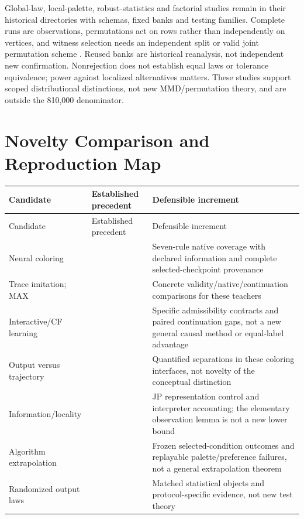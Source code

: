 \documentclass[10pt]{article}
\begin{document}
Global-law, local-palette, robust-statistics and factorial studies remain
in their historical directories with schemas, fixed banks and testing
families. Complete runs are observations, permutations act on rows rather
than independently on vertices, and witness selection needs an independent
split or valid joint permutation scheme
\citep{gretton2012kernel,hemerik2018exact,phipson2010permutation,holm1979simple}.
Reused banks are historical reanalysis, not independent new confirmation.
Nonrejection does not establish equal laws or tolerance equivalence; power
against localized alternatives matters. These studies support scoped
distributional distinctions, not new MMD/permutation theory, and are outside
the 810,000 denominator.

\section{Novelty Comparison and Reproduction Map}\label{app:related}
\begin{longtable}{p{.21\linewidth}p{.34\linewidth}p{.36\linewidth}}
\toprule Candidate & Established precedent & Defensible increment \\
\midrule\endfirsthead
\toprule Candidate & Established precedent & Defensible increment \\
\midrule\endhead
Neural coloring & \citet{lemos2019coloring,langedal2025ordering,
vanderbush2026warm,le2026contrastive} & Seven-rule native coverage with
declared information and complete selected-checkpoint provenance \\
Trace imitation; MAX & \citet{velickovic2020execution,velickovic2022clrs}
& Concrete validity/native/continuation comparisons for these teachers \\
Interactive/CF learning & \citet{ross2011dagger,dehaan2019causal,bevilacqua2023causal} & Specific
admissibility contracts and paired continuation gaps, not a new general
causal method or equal-label advantage \\
Output versus trajectory & \citet{rodionov2023without,velickovic2022clrs}
& Quantified separations in these coloring interfaces, not novelty of the
conceptual distinction \\
Information/locality & \citet{linial1992locality,loukas2020depth,
sato2019approximation} & JP representation control and interpreter accounting;
the elementary observation lemma is not a new lower bound \\
Algorithm extrapolation & \citet{xu2021extrapolate,mathys2023flood,
wittig2026which} & Frozen selected-condition outcomes and replayable
palette/preference failures, not a general extrapolation theorem \\
Randomized output laws & \citet{gretton2012kernel,hemerik2018exact,holm1979simple}
& Matched statistical objects and protocol-specific evidence, not new test theory \\
\bottomrule
\end{longtable}
\end{document}
